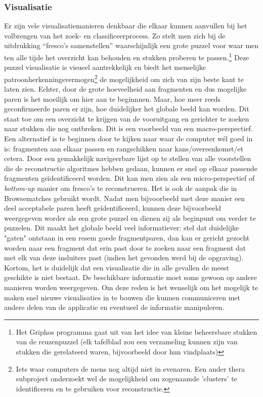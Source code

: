 \subsubsection{Visualisatie}
Er zijn vele visualisatiemanieren denkbaar die elkaar kunnen aanvullen bij het volbrengen van het zoek- en classificeerprocess. Zo stelt men zich bij de uitdrukking ``fresco's samenstellen'' waarschijnlijk een grote puzzel voor waar men ten alle tijde het overzicht kan behouden en stukken proberen te passen.\footnote{Het Griphos programma gaat uit van het idee van kleine beheersbare stukken van de reuzenpuzzel (elk tafelblad zou een verzameling kunnen zijn van stukken die gerelateerd waren, bijvoorbeeld door hun vindplaats)} Deze puzzel visualisatie is visueel aantrekkelijk en biedt het menselijke patroonherkenningsvermogen\footnote{Iets waar computers de mens nog altijd niet in evenaren. Een ander thera subproject onderzoekt wel de mogelijkheid om zogenaamde 'clusters' te identificeren en te gebruiken voor reconstructie.} de mogelijkheid om zich van zijn beste kant te laten zien. Echter, door de grote hoeveelheid aan fragmenten en dus mogelijke paren is het moeilijk om hier aan te beginnnen. Maar, hoe meer reeds geconfirmeerde paren er zijn, hoe duidelijker het globale beeld kan worden. Dit staat toe om een overzicht te krijgen van de vooruitgang en gerichter te zoeken naar stukken die nog ontbreken. Dit is een voorbeeld van een macro-perspectief.\\

Een alternatief is te beginnen door te kijken naar waar de computer w\'el goed in is: fragmenten aan elkaar passen en rangschikken naar kans/overeenkomst/et cetera. Door een gemakkelijk navigeerbare lijst op te stellen van alle voorstellen die de reconstructie algoritmes hebben gedaan, kunnen er snel op elkaar passende fragmenten ge\"identificeerd worden. Dit kan men zien als een micro-perspectief of \emph{bottom-up} manier om fresco's te reconstrueren. Het is ook de aanpak die in Browsematches gebruikt wordt. Nadat men bijvoorbeeld met deze manier een deel acceptabele paren heeft ge\'identificeerd, kunnen deze bijvoorbeeld weergegeven worder als een grote puzzel en dienen zij als beginpunt om verder te puzzelen. Dit maakt het globale beeld veel informatiever: stel dat duidelijke "gaten" ontstaan in een resem goede fragmentparen, dan kan er gericht gezocht worden naar een fragment dat erin past door te zoeken naar een fragment dat met elk van deze insluiters past (indien het gevonden werd bij de opgraving).\\

Kortom, het is duidelijk dat een visualisatie die in alle gevallen de meest geschikte is niet bestaat. De beschikbare informatie moet soms gewoon op andere manieren worden weergegeven. Om deze reden is het wenselijk om het mogelijk te maken snel nieuwe visualisaties in te bouwen die kunnen communiceren met andere delen van de applicatie en eventueel de informatie manipuleren. 